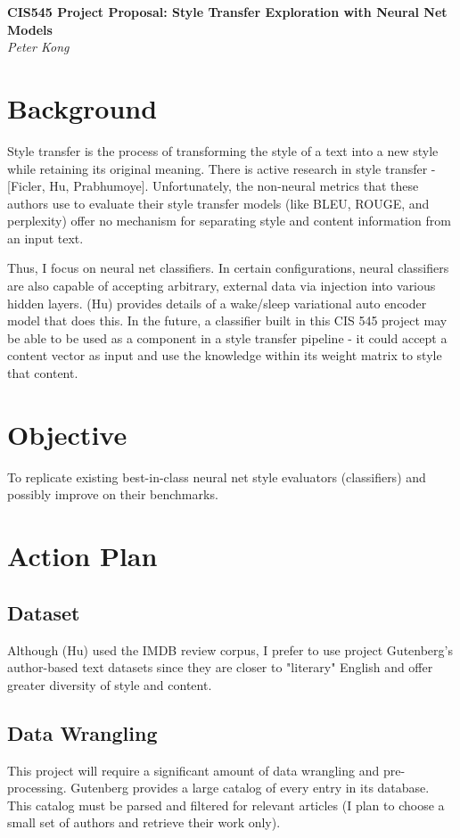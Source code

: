 \documentclass[11pt]{article}
\begin{document}
\begin{center}
	\vspace{1em}
  \LARGE\textbf{CIS545 Project Proposal: Style Transfer Exploration with Neural Net Models}\\
  \large\textit{Peter Kong}
\end{center}

\section{Background}
Style transfer is the process of transforming the style of a text into a new style while retaining its original meaning. There is active research in style transfer - [Ficler, Hu, Prabhumoye]. Unfortunately, the non-neural metrics that these authors use to evaluate their style transfer models (like BLEU, ROUGE, and perplexity) offer no mechanism for separating style and content information from an input text.

Thus, I focus on neural net classifiers. In certain configurations, neural classifiers are also capable of accepting arbitrary, external data via injection into various hidden layers.
(Hu) provides details of a wake/sleep variational auto encoder model that does this. In the future, a classifier built in this CIS 545 project may be able to be used as a component in a style transfer pipeline - it could accept a content vector as input and use the knowledge within its weight matrix to style that content.


\section{Objective}
To replicate existing best-in-class neural net style evaluators (classifiers) and possibly improve on their benchmarks.


\section{Action Plan}
\subsection{Dataset}
Although (Hu) used the IMDB review corpus, I prefer to use project Gutenberg's author-based text datasets since they are closer to "literary" English and offer greater diversity of style and content.

\subsection{Data Wrangling}
This project will require a significant amount of data wrangling and pre-processing. Gutenberg provides a large catalog of every entry in its database. This catalog must be parsed and filtered for relevant articles (I plan to choose a small set of authors and retrieve their work only). 
\end{document}
